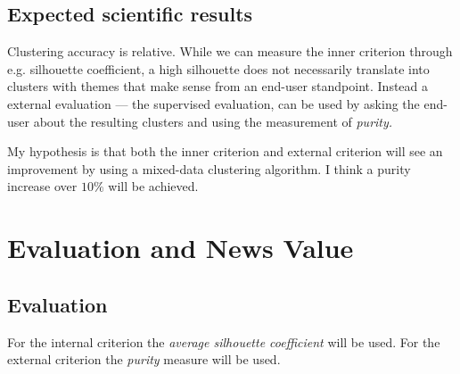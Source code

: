 \documentclass[a4paper,11pt]{article}
\begin{document}


\subsection{Expected scientific results}

Clustering accuracy is relative. While we can measure the inner
criterion through e.g. silhouette coefficient, a high silhouette does not
necessarily translate into clusters with themes that make sense from an
end-user standpoint. Instead a external evaluation --- the supervised evaluation, can be used by asking the
end-user about the resulting clusters and using the measurement of
\textit{purity.}

My hypothesis is that both the inner criterion and external criterion will see an improvement by using a mixed-data clustering algorithm. I think a purity increase over $10\%$ will be achieved.

\section{Evaluation and News Value}

\subsection{Evaluation}
For the internal criterion the \textit{average silhouette coefficient} will be used. For the external criterion the \textit{purity} measure will be used.
\end{document}
